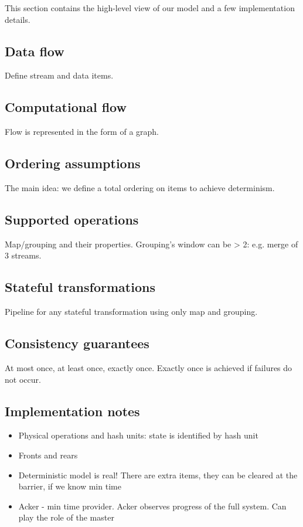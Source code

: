 
\label {fs-model-section}

This section contains the high-level view of our model and a few implementation details.

\subsection{Data flow}
Define stream and data items.

\subsection{Computational flow}
Flow is represented in the form of a graph.

\subsection{Ordering assumptions}
The main idea: we define a total ordering on items to achieve determinism.

\subsection{Supported operations}
Map/grouping and their properties. Grouping's window can be > 2: e.g. merge of 3 streams.

\subsection{Stateful transformations}
Pipeline for any stateful transformation using only map and grouping. 

\subsection{Consistency guarantees}
At most once, at least once, exactly once. Exactly once is achieved if failures do not occur.

\subsection{Implementation notes}

\begin{itemize}
    \item Physical operations and hash units: state is identified by hash unit
    \item Fronts and rears
    \item Deterministic model is real! There are extra items, they can be cleared at the barrier, if we know min time  %
    \item Acker - min time provider. Acker observes progress of the full system. Can play the role of the master %
\end{itemize}